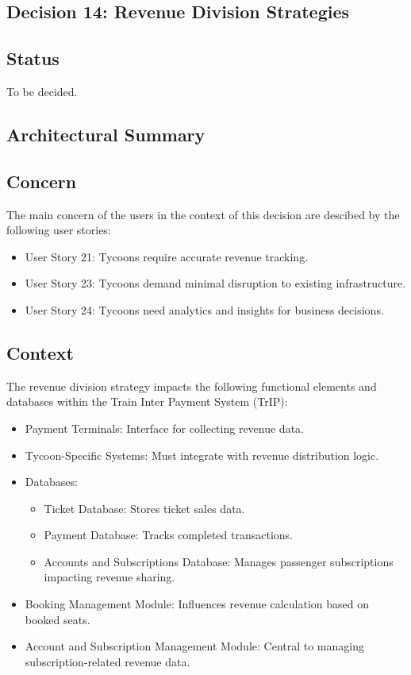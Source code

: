 \subsection{Decision 14: Revenue Division Strategies}

\subsection*{Status}
To be decided.

\subsection*{Architectural Summary}

\subsection*{Concern}
The main concern of the users in the context of this decision are descibed by the following user stories: 
\begin{itemize}
    \item User Story 21: Tycoons require accurate revenue tracking.
    \item User Story 23: Tycoons demand minimal disruption to existing infrastructure.
    \item User Story 24: Tycoons need analytics and insights for business decisions.
\end{itemize}

\subsection*{Context}
The revenue division strategy impacts the following functional elements and databases within the Train Inter Payment System (TrIP):
\begin{itemize}
    \item Payment Terminals: Interface for collecting revenue data.
    \item Tycoon-Specific Systems: Must integrate with revenue distribution logic.
    \item Databases:
    \begin{itemize}
        \item Ticket Database: Stores ticket sales data.
        \item Payment Database: Tracks completed transactions.
        \item Accounts and Subscriptions Database: Manages passenger subscriptions impacting revenue sharing.
    \end{itemize}
    \item Booking Management Module: Influences revenue calculation based on booked seats.
    \item Account and Subscription Management Module: Central to managing subscription-related revenue data.
\end{itemize}

